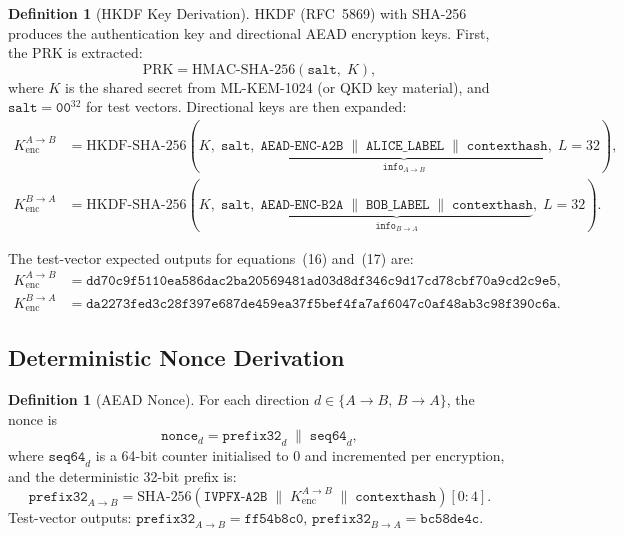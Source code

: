 \documentclass[12pt,letterpaper]{article}
\theoremstyle{plain}
\theoremstyle{definition}
\newtheorem{definition}[theorem]{Definition}
\begin{document}
\begin{definition}[HKDF Key Derivation]
HKDF (RFC~5869) with SHA-256 produces the authentication key and directional
AEAD encryption keys. First, the PRK is extracted:
\[
  \mathrm{PRK} = \mathrm{HMAC\text{-}SHA\text{-}256}(\mathtt{salt},\; K),
    \tag{15}
\]
where $K$ is the shared secret from ML-KEM-1024 (or QKD key material), and
$\mathtt{salt} = \mathtt{00}^{32}$ for test vectors. Directional keys are
then expanded:
\begin{align}
  K_{\mathrm{enc}}^{A\to B} &= \mathrm{HKDF\text{-}SHA\text{-}256}\!\left(
    K,\; \mathtt{salt},\;
    \underbrace{\mathtt{AEAD\text{-}ENC\text{-}A2B} \;\|\;
      \mathtt{ALICE\_LABEL} \;\|\; \mathtt{contexthash}}_{\mathtt{info}_{A\to B}},\;
    L=32\right),  \tag{16} \\
  K_{\mathrm{enc}}^{B\to A} &= \mathrm{HKDF\text{-}SHA\text{-}256}\!\left(
    K,\; \mathtt{salt},\;
    \underbrace{\mathtt{AEAD\text{-}ENC\text{-}B2A} \;\|\;
      \mathtt{BOB\_LABEL} \;\|\; \mathtt{contexthash}}_{\mathtt{info}_{B\to A}},\;
    L=32\right).  \tag{17}
\end{align}
\end{definition}

\noindent The test-vector expected outputs for equations~(16) and~(17) are:
\begin{align*}
  K_{\mathrm{enc}}^{A\to B} &=
    \texttt{dd70c9f5110ea586dac2ba20569481ad03d8df346c9d17cd78cbf70a9cd2c9e5},\\
  K_{\mathrm{enc}}^{B\to A} &=
    \texttt{da2273fed3c28f397e687de459ea37f5bef4fa7af6047c0af48ab3c98f390c6a}.
\end{align*}

\subsection{Deterministic Nonce Derivation}

\begin{definition}[AEAD Nonce]
For each direction $d \in \{A{\to}B,\, B{\to}A\}$, the nonce is
\[
  \mathtt{nonce}_d = \mathtt{prefix32}_d \;\|\; \mathtt{seq64}_d,  \tag{18}
\]
where $\mathtt{seq64}_d$ is a 64-bit counter initialised to 0 and incremented
per encryption, and the deterministic 32-bit prefix is:
\[
  \mathtt{prefix32}_{A\to B} =
    \mathrm{SHA\text{-}256}\!\left(\mathtt{IVPFX\text{-}A2B} \;\|\;
      K_{\mathrm{enc}}^{A\to B} \;\|\; \mathtt{contexthash}\right)[0:4].
  \tag{19}
\]
Test-vector outputs: $\mathtt{prefix32}_{A\to B} = \texttt{ff54b8c0}$,
$\mathtt{prefix32}_{B\to A} = \texttt{bc58de4c}$.
\end{definition}
\end{document}
